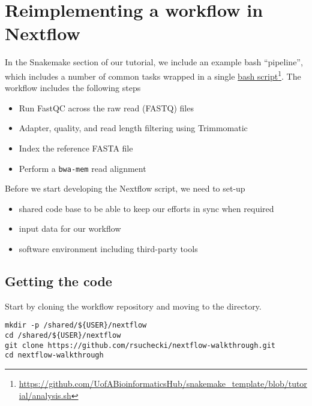\newpage


\section{Reimplementing a workflow in Nextflow}

In the Snakemake section of our tutorial, we include an example bash ``pipeline'', which 
includes a number of common tasks wrapped in a single 
\href{https://github.com/UofABioinformaticsHub/snakemake_template/blob/tutorial/analysis.sh}{bash script}\footnote{\url{https://github.com/UofABioinformaticsHub/snakemake_template/blob/tutorial/analysis.sh}}.
The workflow includes the following steps

\begin{itemize}
  \item Run FastQC across the raw read (FASTQ) files
  \item Adapter, quality, and read length filtering using Trimmomatic
  \item Index the reference FASTA file
  \item Perform a \texttt{bwa-mem} read alignment
\end{itemize}

Before we start developing the Nextflow script, we need to set-up 
\begin{itemize}
  \item shared code base to be able to keep our efforts in sync when required
  \item input data for our workflow
  \item software environment including third-party tools
\end{itemize}



\subsection{Getting the code}

\begin{steps}
Start by cloning the workflow repository and moving to the directory.

\begin{lstlisting}
mkdir -p /shared/${USER}/nextflow
cd /shared/${USER}/nextflow
git clone https://github.com/rsuchecki/nextflow-walkthrough.git 
cd nextflow-walkthrough
\end{lstlisting}
\end{steps}



